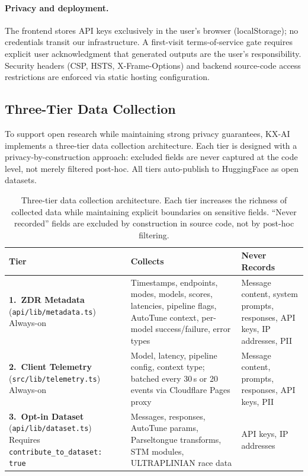 \documentclass[11pt]{article}
\begin{document}
\paragraph{Privacy and deployment.} The frontend stores API keys exclusively in the user's browser (localStorage); no credentials transit our infrastructure. A first-visit terms-of-service gate requires explicit user acknowledgment that generated outputs are the user's responsibility. Security headers (CSP, HSTS, X-Frame-Options) and backend source-code access restrictions are enforced via static hosting configuration.

\subsection{Three-Tier Data Collection}
\label{sec:datacollection}

To support open research while maintaining strong privacy guarantees, KX-AI implements a three-tier data collection architecture. Each tier is designed with a privacy-by-construction approach: excluded fields are never captured at the code level, not merely filtered post-hoc. All tiers auto-publish to HuggingFace as open datasets.

\begin{table}[t]
\caption{Three-tier data collection architecture. Each tier increases the richness of collected data while maintaining explicit boundaries on sensitive fields. ``Never recorded'' fields are excluded by construction in source code, not by post-hoc filtering.}
\label{tab:datacollection}
\centering
\small
\begin{tabular}{@{}p{2.4cm}p{4.2cm}p{4.2cm}@{}}
\toprule
Tier & Collects & Never Records \\
\midrule
\textbf{1.\ ZDR Metadata} \newline (\texttt{api/lib/metadata.ts}) \newline Always-on &
Timestamps, endpoints, modes, models, scores, latencies, pipeline flags, AutoTune context, per-model success/failure, error types &
Message content, system prompts, responses, API keys, IP addresses, PII \\
\midrule
\textbf{2.\ Client Telemetry} \newline (\texttt{src/lib/telemetry.ts}) \newline Always-on &
Model, latency, pipeline config, context type; batched every 30\,s or 20 events via Cloudflare Pages proxy &
Message content, prompts, responses, API keys, PII \\
\midrule
\textbf{3.\ Opt-in Dataset} \newline (\texttt{api/lib/dataset.ts}) \newline Requires \texttt{contribute\_to\_dataset: true} &
Messages, responses, AutoTune params, Parseltongue transforms, STM modules, ULTRAPLINIAN race data &
API keys, IP addresses \\
\bottomrule
\end{tabular}
\end{table}
\end{document}
